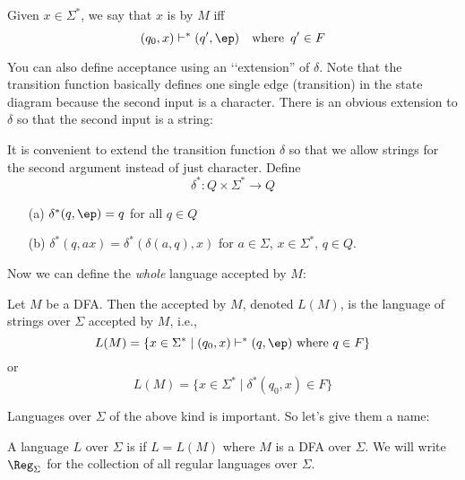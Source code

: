 \begin{defn}
Given $x \in \Sigma^*$, we say that $x$ is
 by $M$ iff
\[(q_0,x) \vdash^* (q',\ep) \quad \text{where \,} q' \in F \]
\end{defn}







\newpage
You can also define acceptance using an \lq\lq extension'' of $\delta$.
Note that the transition function basically defines one single
edge (transition) in the state diagram because the second input is a
character.
There is an obvious extension to $\delta$ so that the second
input is a string:

\begin{defn}
It is convenient to extend the transition function $\delta$ so that
we allow strings for the second argument instead of just character.
Define
\[
 \delta^* : Q \times \Sigma^* \rightarrow Q
\]
\begin{itemize}
 \item[(a)] $\delta^*(q, \ep) = q$ for all $q \in Q$
 \item[(b)] $\delta^*(q, ax) = \delta^*( \delta(a,q), x)$ for $a \in
 \Sigma$, $x \in \Sigma^*$, $q \in Q$.
\end{itemize}
\end{defn}





Now we can define the \textit{whole} language accepted by $M$:

\begin{defn} Let $M$ be a DFA. Then the  accepted by $M$,
denoted $L(M)$, is the language of strings over $\Sigma$ accepted
by $M$, i.e.,
\[
L(M) = \{x \in \Sigma^* \mid (q_0, x) \vdash^* (q, \ep) \text{ where } q \in F \}
\]
or
\[
L(M) = \{x \in \Sigma^* \mid \delta^* (q_0, x) \in F \}
\]
\end{defn}





\newpage
Languages over $\Sigma$ of the above kind is important.
So let's give them a name: 

\begin{defn}
A language $L$ over $\Sigma$
is  if $L = L(M)$ where $M$ is a DFA over $\Sigma$.
We will write $\Reg_\Sigma$ for the collection of all 
regular languages over $\Sigma$.
\end{defn}


